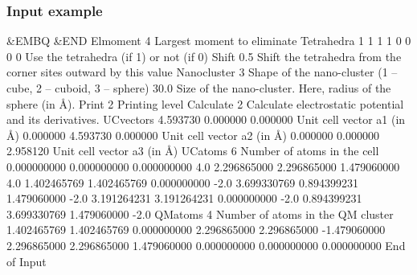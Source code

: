 \subsubsection{Input example}
\begin{inputlisting}
 &EMBQ &END
Elmoment
4                              Largest moment to eliminate
Tetrahedra
1 1 1 1 0 0 0 0                Use the tetrahedra (if 1) or not (if 0)
Shift
0.5                            Shift the tetrahedra from the corner sites outward by this value
Nanocluster
3                              Shape of the nano-cluster (1 -- cube, 2 -- cuboid, 3 -- sphere)
30.0                           Size of the nano-cluster. Here, radius of the sphere (in \AA).
Print
2                              Printing level
Calculate
2                              Calculate electrostatic potential and its derivatives.
UCvectors
4.593730 0.000000 0.000000     Unit cell vector a1 (in \AA)
0.000000 4.593730 0.000000     Unit cell vector a2 (in \AA)
0.000000 0.000000 2.958120     Unit cell vector a3 (in \AA)
UCatoms
6                              Number of atoms in the cell
0.000000000   0.000000000   0.000000000   4.0
2.296865000   2.296865000   1.479060000   4.0
1.402465769   1.402465769   0.000000000  -2.0
3.699330769   0.894399231   1.479060000  -2.0
3.191264231   3.191264231   0.000000000  -2.0
0.894399231   3.699330769   1.479060000  -2.0
QMatoms
4                              Number of atoms in the QM cluster
1.402465769   1.402465769   0.000000000
2.296865000   2.296865000  -1.479060000
2.296865000   2.296865000   1.479060000
0.000000000   0.000000000   0.000000000
End of Input
\end{inputlisting}
